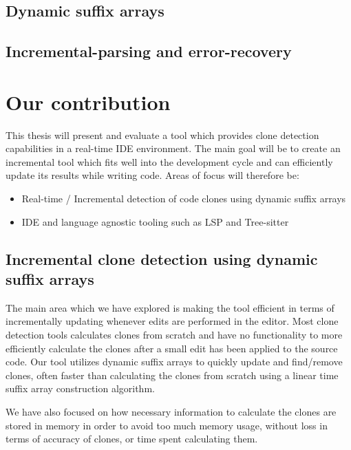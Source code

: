 \subsection{Dynamic suffix arrays}


\subsection{Incremental-parsing and error-recovery}



\section{Our contribution}

This thesis will present and evaluate a tool which provides clone detection capabilities
in a real-time IDE environment. The main goal will be to create an incremental tool which
fits well into the development cycle and can efficiently update its results while writing
code. Areas of focus will therefore be:

\begin{itemize}
	\item Real-time / Incremental detection of code clones using dynamic suffix arrays
	\item IDE and language agnostic tooling such as LSP and Tree-sitter
\end{itemize}

\subsection{Incremental clone detection using dynamic suffix arrays}

The main area which we have explored is making the tool efficient in terms of
incrementally updating whenever edits are performed in the editor. Most clone detection
tools calculates clones from scratch and have no functionality to more efficiently
calculate the clones after a small edit has been applied to the source code. Our tool
utilizes dynamic suffix arrays to quickly update and find/remove clones, often faster than
calculating the clones from scratch using a linear time suffix array construction
algorithm.

We have also focused on how necessary information to calculate the clones are stored in
memory in order to avoid too much memory usage, without loss in terms of accuracy of
clones, or time spent calculating them.

